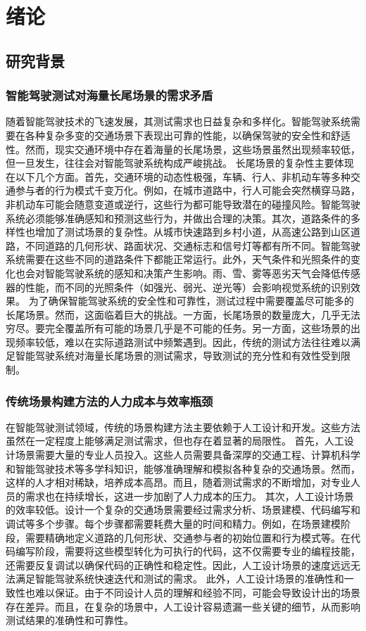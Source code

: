 \chapter{绪论}
\section{研究背景}
\subsection{智能驾驶测试对海量长尾场景的需求矛盾}
随着智能驾驶技术的飞速发展，其测试需求也日益复杂和多样化。智能驾驶系统需要在各种复杂多变的交通场景下表现出可靠的性能，以确保驾驶的安全性和舒适性。然而，现实交通环境中存在着海量的长尾场景，这些场景虽然出现频率较低，但一旦发生，往往会对智能驾驶系统构成严峻挑战。
长尾场景的复杂性主要体现在以下几个方面。首先，交通环境的动态性极强，车辆、行人、非机动车等多种交通参与者的行为模式千变万化。例如，在城市道路中，行人可能会突然横穿马路，非机动车可能会随意变道或逆行，这些行为都可能导致潜在的碰撞风险。智能驾驶系统必须能够准确感知和预测这些行为，并做出合理的决策。其次，道路条件的多样性也增加了测试场景的复杂性。从城市快速路到乡村小道，从高速公路到山区道路，不同道路的几何形状、路面状况、交通标志和信号灯等都有所不同。智能驾驶系统需要在这些不同的道路条件下都能正常运行。此外，天气条件和光照条件的变化也会对智能驾驶系统的感知和决策产生影响。雨、雪、雾等恶劣天气会降低传感器的性能，而不同的光照条件（如强光、弱光、逆光等）会影响视觉系统的识别效果。
为了确保智能驾驶系统的安全性和可靠性，测试过程中需要覆盖尽可能多的长尾场景。然而，这面临着巨大的挑战。一方面，长尾场景的数量庞大，几乎无法穷尽。要完全覆盖所有可能的场景几乎是不可能的任务。另一方面，这些场景的出现频率较低，难以在实际道路测试中频繁遇到。因此，传统的测试方法往往难以满足智能驾驶系统对海量长尾场景的测试需求，导致测试的充分性和有效性受到限制。

\subsection{传统场景构建方法的人力成本与效率瓶颈}
在智能驾驶测试领域，传统的场景构建方法主要依赖于人工设计和开发。这些方法虽然在一定程度上能够满足测试需求，但也存在着显著的局限性。
首先，人工设计场景需要大量的专业人员投入。这些人员需要具备深厚的交通工程、计算机科学和智能驾驶技术等多学科知识，能够准确理解和模拟各种复杂的交通场景。然而，这样的人才相对稀缺，培养成本高昂。而且，随着测试需求的不断增加，对专业人员的需求也在持续增长，这进一步加剧了人力成本的压力。
其次，人工设计场景的效率较低。设计一个复杂的交通场景需要经过需求分析、场景建模、代码编写和调试等多个步骤。每个步骤都需要耗费大量的时间和精力。例如，在场景建模阶段，需要精确地定义道路的几何形状、交通参与者的初始位置和行为模式等。在代码编写阶段，需要将这些模型转化为可执行的代码，这不仅需要专业的编程技能，还需要反复调试以确保代码的正确性和稳定性。因此，人工设计场景的速度远远无法满足智能驾驶系统快速迭代和测试的需求。
此外，人工设计场景的准确性和一致性也难以保证。由于不同设计人员的理解和经验不同，可能会导致设计出的场景存在差异。而且，在复杂的场景中，人工设计容易遗漏一些关键的细节，从而影响测试结果的准确性和可靠性。

